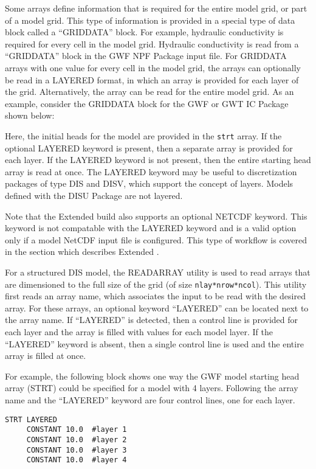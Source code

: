 Some arrays define information that is required for the entire model grid, or part of a model grid.  This type of information is provided in a special type of data block called a ``GRIDDATA'' block.  For example, hydraulic conductivity is required for every cell in the model grid.  Hydraulic conductivity is read from a ``GRIDDATA'' block in the \mf GWF NPF Package input file.  For GRIDDATA arrays with one value for every cell in the model grid, the arrays can optionally be read in a LAYERED format, in which an array is provided for each layer of the grid.  Alternatively, the array can be read for the entire model grid.  As an example, consider the GRIDDATA block for the \mf GWF or GWT IC Package shown below:



Here, the initial heads for the model are provided in the \texttt{strt} array.  If the optional LAYERED keyword is present, then a separate array is provided for each layer.  If the LAYERED keyword is not present, then the entire starting head array is read at once.  The LAYERED keyword may be useful to discretization packages of type DIS and DISV, which support the concept of layers.  Models defined with the DISU Package are not layered.

Note that the \mf Extended build also supports an optional NETCDF keyword.  This keyword is not compatable with the LAYERED keyword and is a valid option only if a model NetCDF input file is configured.  This type of workflow is covered in the section which describes Extended \mf.

For a structured DIS model, the READARRAY utility is used to read arrays that are dimensioned to the full size of the grid (of size \texttt{nlay*nrow*ncol}). This utility first reads an array name, which associates the input to be read with the desired array.  For these arrays, an optional keyword ``LAYERED'' can be located next to the array name.  If ``LAYERED'' is detected, then a control line is provided for each layer and the array is filled with values for each model layer.  If the ``LAYERED'' keyword is absent, then a single control line is used and the entire array is filled at once.

For example, the following block shows one way the \mf GWF model starting head array (STRT) could be specified for a model with 4 layers.  Following the array name and the ``LAYERED'' keyword are four control lines, one for each layer.

\begin{lstlisting}[style=inputfile]
  STRT LAYERED
     CONSTANT 10.0  #layer 1
     CONSTANT 10.0  #layer 2
     CONSTANT 10.0  #layer 3
     CONSTANT 10.0  #layer 4
\end{lstlisting}

